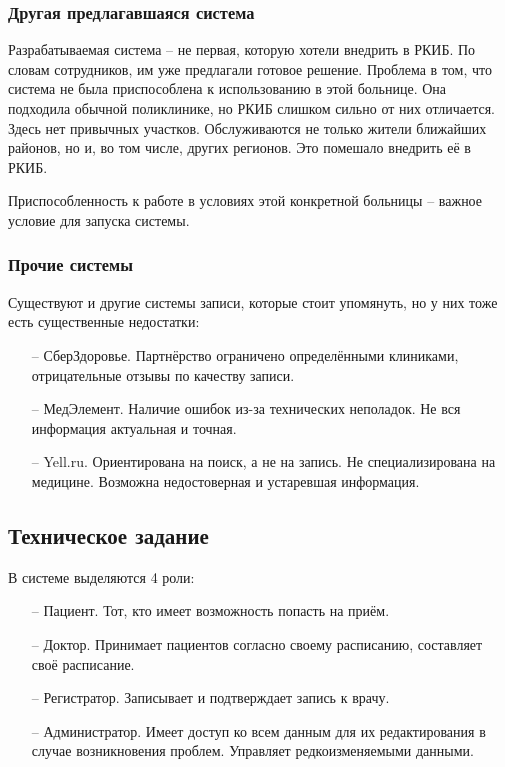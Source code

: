\documentclass[a4paper,article]{article}
\begin{document}
\begin{sloppypar}
    \newpage

    \subsubsection{Другая предлагавшаяся система}

        Разрабатываемая система -- не первая, которую хотели внедрить в РКИБ. По словам сотрудников, им уже предлагали готовое решение. Проблема в том, что система не была приспособлена к использованию в этой больнице. Она подходила обычной поликлинике, но РКИБ слишком сильно от них отличается. Здесь нет привычных участков. Обслуживаются не только жители ближайших районов, но и, во том числе, других регионов. Это помешало внедрить её в РКИБ.

        Приспособленность к работе в условиях этой конкретной больницы -- важное условие для запуска системы.
        
    \subsubsection{Прочие системы}
    
        Существуют и другие системы записи, которые стоит упомянуть, но у них тоже есть существенные недостатки:
        
        \begin{itemize}[nolistsep]
            \item[--] СберЗдоровье. Партнёрство ограничено определёнными клиниками, отрицательные отзывы по качеству записи.
            \item[--] МедЭлемент. Наличие ошибок из-за технических неполадок. Не вся информация актуальная и точная.
            \item[--] Yell.ru. Ориентирована на поиск, а не на запись. Не специализирована на медицине. Возможна недостоверная и устаревшая информация.
        \end{itemize}

    \subsection{Техническое задание}\label{Техническое задание}

        В системе выделяются 4 роли:

        \begin{itemize}[nolistsep]
            \item[--] Пациент. Тот, кто имеет возможность попасть на приём.
            \item[--] Доктор. Принимает пациентов согласно своему расписанию, составляет своё расписание.
            \item[--] Регистратор. Записывает и подтверждает запись к врачу.
            \item[--] Администратор. Имеет доступ ко всем данным для их редактирования в случае возникновения проблем. Управляет редкоизменяемыми данными.
        \end{itemize}


\end{sloppypar}
\end{document}
